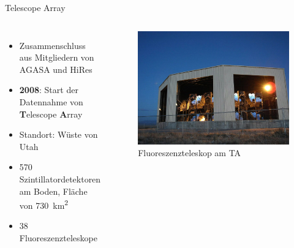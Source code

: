 \documentclass[aspectratio=1610, professionalfonts, 9pt, hyperref={colorlinks=false}]{beamer}
\begin{document}
\begin{frame}{Telescope Array}
  \begin{columns}
      \begin{itemize}
        \setlength\itemsep{0.5em}
        \item Zusammenschluss aus Mitgliedern von AGASA und HiRes
        \item \textbf{2008}: Start der Datennahme von \textbf{T}elescope \textbf{A}rray
        \item Standort: Wüste von Utah
        \item 570 Szintillatordetektoren am Boden, Fläche von \SI{730}{\kilo\metre\squared}
        \item 38 Fluoreszenzteleskope

      \end{itemize}
        \vspace*{10px}
  
      \begin{figure}
          \centering
          \includegraphics[width=\linewidth]{images/BRM-FD-open.jpg}
          \caption{Fluoreszenzteleskop am TA \cite{ta}}
      \end{figure}
  \end{columns}
\end{frame}
\end{document}
